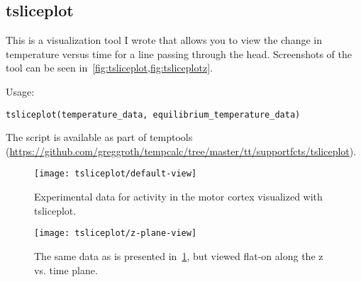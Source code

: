 \subsection{tsliceplot}
This is a visualization tool I wrote that allows you to view the change in temperature versus time for a line passing through the head.  Screenshots of the tool can be seen in~\cref{fig:tsliceplot,fig:tsliceplotz}.

Usage:
\begin{lstlisting}[style=snippet,label=invoke-tsliceplot]
  tsliceplot(temperature_data, equilibrium_temperature_data)
\end{lstlisting}

The script is available as part of temptools (\url{https://github.com/greggroth/tempcalc/tree/master/tt/supportfcts/tsliceplot}).

\begin{figure}[hbt]
  \centering
    \caption[Visualization using tsliceplot]{Experimental data for activity in the motor cortex visualized with tsliceplot. \label{fig:tsliceplot}}
    \texttt{[image: tsliceplot/default-view]}
  \centering
\end{figure}

\begin{figure}[hbt]
  \centering
    \caption[Visualization using tsliceplot (z v. t plane)]{The same data as is presented in~\cref{fig:tsliceplot}, but viewed flat-on along the z vs. time plane.\label{fig:tsliceplotz}}
    \texttt{[image: tsliceplot/z-plane-view]}
  \centering
\end{figure}